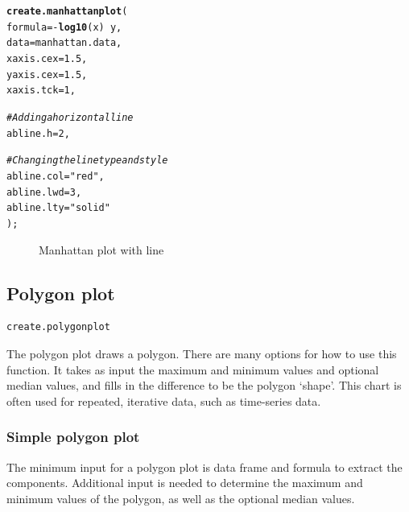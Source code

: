 \documentclass[letterpaper]{article}\usepackage[]{graphicx}\usepackage[]{color}
\makeatletter
\newcommand{\hlnum}[1]{\textcolor[rgb]{0.686,0.059,0.569}{#1}}%
\newcommand{\hlstr}[1]{\textcolor[rgb]{0.192,0.494,0.8}{#1}}%
\newcommand{\hlcom}[1]{\textcolor[rgb]{0.678,0.584,0.686}{\textit{#1}}}%
\newcommand{\hlopt}[1]{\textcolor[rgb]{0,0,0}{#1}}%
\newcommand{\hlstd}[1]{\textcolor[rgb]{0.345,0.345,0.345}{#1}}%
\newcommand{\hlkwc}[1]{\textcolor[rgb]{0.333,0.667,0.333}{#1}}%
\newcommand{\hlkwd}[1]{\textcolor[rgb]{0.737,0.353,0.396}{\textbf{#1}}}%
\newenvironment{kframe}{%
 \def\at@end@of@kframe{}%
 \ifinner\ifhmode%
  \def\at@end@of@kframe{\end{minipage}}%
  \begin{minipage}{\columnwidth}%
 \fi\fi%
 \def\FrameCommand##1{\hskip\@totalleftmargin \hskip-\fboxsep
 \colorbox{shadecolor}{##1}\hskip-\fboxsep
     \hskip-\linewidth \hskip-\@totalleftmargin \hskip\columnwidth}%
 \MakeFramed {\advance\hsize-\width
   \@totalleftmargin\z@ \linewidth\hsize
   \@setminipage}}%
 {\par\unskip\endMakeFramed%
 \at@end@of@kframe}
\newenvironment{knitrout}{}{} %
\makeatother
\begin{document}
\begin{knitrout}
\color{fgcolor}\begin{kframe}
\begin{alltt}
\hlkwd{create.manhattanplot}\hlstd{(}
    \hlkwc{formula} \hlstd{=} \hlopt{-}\hlkwd{log10}\hlstd{(x)} \hlopt{~} \hlstd{y,}
    \hlkwc{data} \hlstd{= manhattan.data,}
    \hlkwc{xaxis.cex} \hlstd{=} \hlnum{1.5}\hlstd{,}
    \hlkwc{yaxis.cex} \hlstd{=} \hlnum{1.5}     \hlstd{,}
    \hlkwc{xaxis.tck} \hlstd{=} \hlnum{1}\hlstd{,}

    \hlcom{# Adding a horizontal line}
    \hlkwc{abline.h} \hlstd{=} \hlnum{2}\hlstd{,}

    \hlcom{# Changing the line type and style}
    \hlkwc{abline.col} \hlstd{=} \hlstr{"red"}\hlstd{,}
    \hlkwc{abline.lwd} \hlstd{=} \hlnum{3}\hlstd{,}
    \hlkwc{abline.lty} \hlstd{=} \hlstr{"solid"}
    \hlstd{);}
\end{alltt}
\end{kframe}\begin{figure}[]


{\centering {} 

}

\caption[Manhattan plot with line]{Manhattan plot with line\label{fig:manhattan2}}
\end{figure}


\end{knitrout}

\subsection{Polygon plot}
\begin{verbatim}
create.polygonplot
\end{verbatim}

The polygon plot draws a polygon. There are many options for how to use this function. It takes as input the maximum and minimum values and optional median values, and fills in the difference to be the polygon `shape'. This chart is often used for repeated, iterative data, such as time-series data.

\subsubsection{Simple polygon plot}
The minimum input for a polygon plot is data frame and formula to extract the components. Additional input is needed to determine the maximum and minimum values of the polygon, as well as the optional median values.
\end{document}
